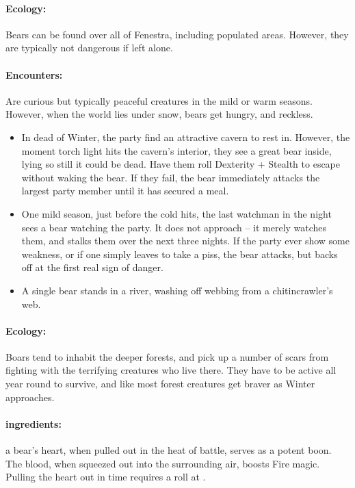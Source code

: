 \begin{multicols}{2}
\begin{itemize}
\end{itemize}

\label{bear}

\paragraph{Ecology:} Bears can be found over all of Fenestra, including populated areas.  However, they are typically not dangerous if left alone.

\bear

\paragraph{Encounters:} Are curious but typically peaceful creatures in the mild or warm seasons.
However, when the world lies under snow, bears get hungry, and reckless.

\begin{itemize}
  \item
  In dead of Winter, the party find an attractive cavern to rest in. However, the moment torch light hits the cavern's interior, they see a great bear inside, lying so still it could be dead.
  Have them roll Dexterity + Stealth to escape without waking the bear.
  If they fail, the bear immediately attacks the largest party member until it has secured a meal.
  \item
  One mild season, just before the cold hits, the last watchman in the night sees a bear watching the party.
  It does not approach -- it merely watches them, and stalks them over the next three nights.
  If the party ever show some weakness, or if one simply leaves to take a piss, the bear attacks, but backs off at the first real sign of danger.
  \item
  A single bear stands in a river, washing off webbing from a chitincrawler's web.
\end{itemize}

\label{boar}

\paragraph{Ecology:} Boars tend to inhabit the deeper forests, and pick up a number of scars from fighting with the terrifying creatures who live there.
They have to be active all year round to survive, and like most forest creatures get braver as Winter approaches.

\boar

\paragraph{\Glspl{ingredient}:}
a bear's heart, when pulled out in the heat of battle, serves as a potent \gls{boon}.
The blood, when squeezed out into the surrounding air, boosts Fire magic.
Pulling the heart out in time requires a  roll at \tn[10].


\end{multicols}
